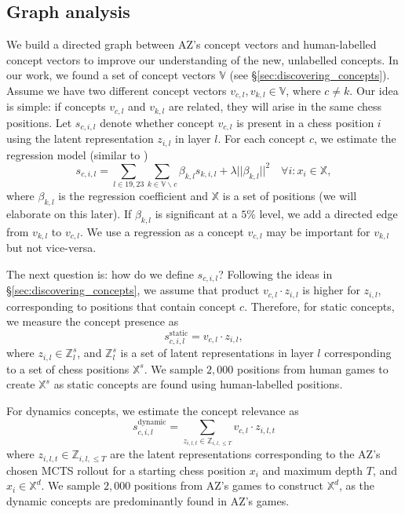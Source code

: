 \documentclass{article}
\def\Xset{\mathbb{X}}
\def\Zset{\mathbb{Z}}
\def\vcld{v_{c,l}\cdot}
\def\vcl{v_{c,l}}
\begin{document}
\subsection{Graph analysis} \label{appx:graph_analysis}
We build a directed graph between AZ's concept vectors and human-labelled concept vectors to improve our understanding of the new, unlabelled concepts.
In our work, we found a set of concept vectors $\mathbb{V}$ (see \S\ref{sec:discovering_concepts}). Assume we have two different concept vectors $v_{c,l}, v_{k,l} \in \mathbb{V}$, where $c \neq k$. 
Our idea is simple: if concepts $\vcl$ and $v_{k,l}$ are related, they will arise in the same chess positions.  
Let $s_{c,i,l}$ denote whether concept $\vcl$ is present in a chess position $i$ using the latent representation $z_{i,l}$ in layer $l$. 
For each concept $c$, we estimate the regression model (similar to \cite{meinshausen2006high})
\begin{equation} \label{graph regression}
  s_{c,i, l} =\sum_{l\in 19,23} \sum_{k \in \mathbb{V}\backslash c} \beta_{k,l} s_{k,i, l} + \lambda ||\beta_{k,l}||^2 \quad \forall i: x_i \in \Xset,
\end{equation}
where $\beta_{k,l}$ is the regression coefficient and $\Xset$ is a set of positions 
(we will elaborate on this later). If $\beta_{k,l}$ is significant at a $5\%$ level, we add a directed edge from $v_{k,l}$ to $\vcl$.
We use a regression as a concept $\vcl$ may be important for $v_{k,l}$ but not vice-versa.

The next question is: how do we define $s_{c, i, l}$? Following the ideas in \S\ref{sec:discovering_concepts}, we assume that product $\vcld z_{i,l}$ is higher for $z_{i,l}$, corresponding to positions that contain concept $c$.  
Therefore, for static concepts, we measure the concept presence as 
\begin{equation}
    s_{c,i,l}^{\text{static}}= \vcl \cdot z_{i,l},
\end{equation}
where $z_{i,l} \in \Zset_l^s$, and $\Zset_l^s$ is a set of latent representations in layer $l$ corresponding to a set of chess positions $\Xset^s$.
We sample $2,000$ positions from human games to create $\Xset^s$ as static concepts are found using human-labelled positions.

For dynamics concepts, we estimate the concept relevance as
\begin{equation}
    s_{c, i,l}^{\text{dynamic}}= \sum_{z_{i,l,t} \in \Zset_{i,l, \leq T}} \vcld z_{i,l,t}
\end{equation}
where $z_{i,l, t} \in \Zset_{i,l, \leq T}$ are the latent representations corresponding to the AZ's chosen MCTS rollout for a starting chess position $x_i$ and maximum depth $T$, and $x_i \in \Xset^d$.
We sample $2,000$ positions from AZ's games to construct $\Xset^d$, as the dynamic concepts are predominantly found in AZ's games. 
\end{document}
